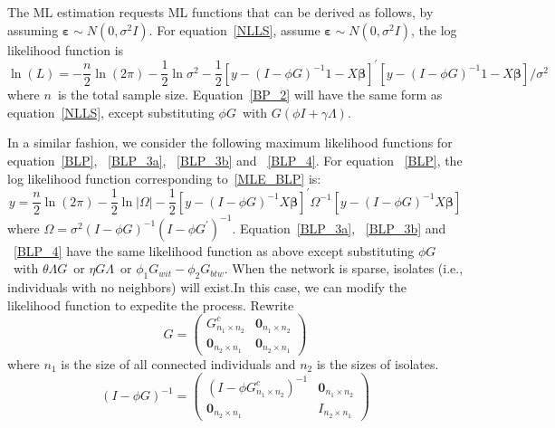 \documentclass[nojss]{jss}
\begin{document}
	The ML estimation requests ML functions that can be derived as follows, by assuming $\mathbf{\varepsilon}\sim N(0,\sigma ^{2}I).$ For equation~\ref{NLLS}, assume $\mathbf{\varepsilon }\sim N(0,\sigma ^{2}I)$, the log likelihood function is
	\begin{equation}
	\ln \left( L\right) =-\frac{n}{2}\ln \left( 2\pi \right) -\frac{1}{2}\ln
	\sigma ^{2}-\frac{1}{2}\left[y-(I-\phi G)^{-1}1-X\mathbf{\beta }%
	\right] ^{\prime }\left[ y-(I-\phi G)^{-1}1-X\mathbf{\beta }\right]
	/\sigma ^{2}
	\end{equation}
	where $n$\ is the total sample size. Equation~\ref{BP_2} will have the same form as equation~\ref{NLLS}, except substituting $\phi G$\ with $G(\phi I+\gamma \Lambda)$.
	
	In a similar fashion, we consider the following maximum likelihood functions for equation~\ref{BLP}, ~\ref{BLP_3a}, ~\ref{BLP_3b} and ~\ref{BLP_4}.
	For equation ~\ref{BLP}, the log likelihood function corresponding to~\ref{MLE_BLP} is:
	\begin{equation}
	y=\frac{n}{2}\ln \left( 2\pi \right) -\frac{1}{2}\ln |\Omega |-\frac{1}{2}%
	\left[ y-(I-\phi G)^{-1}X\mathbf{\beta }\right] ^{\prime }\Omega ^{-1}\left[
	y-(I-\phi G)^{-1}X\mathbf{\beta }\right]  
	\label{MLE_BLP}
	\end{equation}
	where $\Omega =\sigma ^{2}(I-\phi G)^{-1}(I-\phi G^{\prime })^{-1}$. Equation~\ref{BLP_3a}, ~\ref{BLP_3b} and ~\ref{BLP_4} have the same likelihood function as above except substituting $\phi G$\ with $\theta \Lambda G$\ or $\eta G\Lambda $\ or $\phi _{1}G_{wit}-\phi _{2}G_{btw}$.
	When the network is sparse, isolates (i.e., individuals with no neighbors) will exist.In this case, we can modify the
	likelihood function to expedite the process. Rewrite
	\begin{equation}
	G=\left( 
	\begin{array}{cc}
	G_{n_{1}\times n_{2}}^{c} & \mathbf{0}_{n_{1}\times n_{2}} \\ 
	\mathbf{0}_{n_{2}\times n_{1}} & \mathbf{0}_{n_{2}\times n_{1}}%
	\end{array}\right)
	\end{equation}
	where $n_{1}$ is the size of all connected individuals and $n_{2}$ is the sizes of isolates.
	\begin{equation}
	\left( I-\phi G\right) ^{-1}=\left( 
	\begin{array}{cc}
	\left(I-\phi G_{n_{1}\times n_{2}}^{c}\right) ^{-1} & \mathbf{0}_{n_{1}\times n_{2}}
	\\
	\mathbf{0}_{n_{2}\times n_{1}} & I_{n_{2}\times n_{1}}
	\end{array}\right)
	\end{equation}
\end{document}
